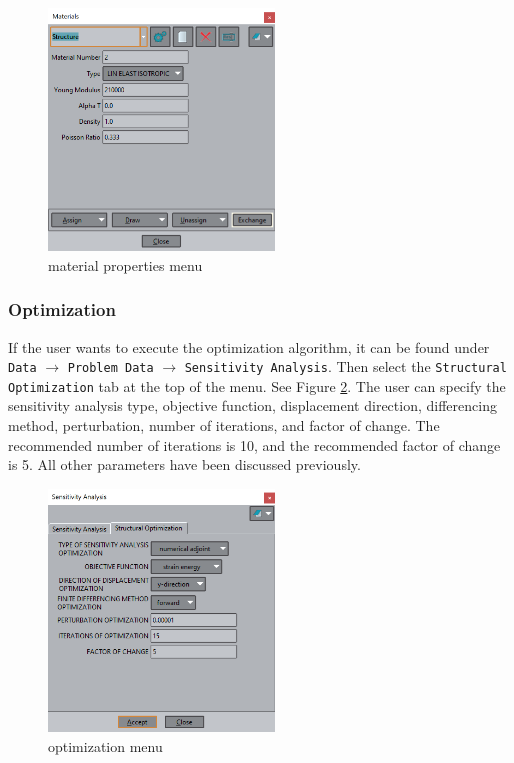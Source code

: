 \begin{figure}[ht]
  \centering
  \includegraphics[width=60mm]{images/GiD_materials.png}
  \caption{material properties menu}
  \label{fig:GiDMaterialsMenu}
\end{figure}

\subsubsection{Optimization}
If the user wants to execute the optimization algorithm, it can be found under \texttt{Data} $\rightarrow$ \texttt{Problem Data} $\rightarrow$ \texttt{Sensitivity Analysis}. Then select the \texttt{Structural Optimization} tab at the top of the menu. See Figure \ref{fig:GiDOptimizationMenu}. The user can specify the sensitivity analysis type, objective function, displacement direction, differencing method, perturbation, number of iterations, and factor of change. The recommended number of iterations is 10, and the recommended factor of change is 5. All other parameters have been discussed previously.

\begin{figure}[ht]
  \centering
  \includegraphics[width=60mm]{images/GiD_optimization.png}
  \caption{optimization menu}
  \label{fig:GiDOptimizationMenu}
\end{figure}

